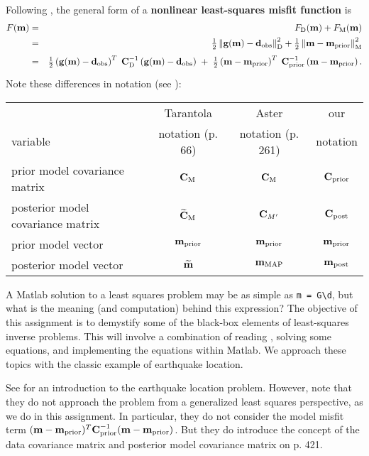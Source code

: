 \documentclass[11pt,titlepage,fleqn]{article}
\begin{document}
Following \citet[][p.~205]{Tarantola2005}, the general form of a {\bf nonlinear least-squares misfit function} is
%
\begin{eqnarray*}
\misfitvar(\bem) &=& \misfitvar_{\rm D}(\bem) + \misfitvar_{\rm M}(\bem) 
\\
&=& \hlf \left\| \bg(\bem) - \bd_{\rm obs} \right\|^2_{\rm D} + \hlf \left\| \bem - \mprior \right\|^2_{\rm M}
\nonumber \\
&=& \hlf \left( \bg(\bem) - \bd_{\rm obs}\right)^T \; \covdi \left( \bg(\bem) - \bd_{\rm obs} \right)
\;+\; \hlf \left( \bem - \mprior \right)^T \; \cpriori \left( \bem - \mprior \right).
\nonumber
\end{eqnarray*}
%
Note these differences in notation (see ):

\vspace{0.2cm}
\begin{tabular}{l|c|c|c}
\hline
                                    & Tarantola         & Aster    & our \\ 
variable                            & notation (p. 66) & notation (p. 261)  & notation \\ \hline
prior model covariance matrix       & $\mbox{${\bf C}$}_{\rm M}$                & $\mbox{${\bf C}$}_{\rm M}$    & $\mbox{${\bf C}$}_{\rm prior}$    \\ \hline
posterior model covariance matrix   & $\widetilde{\mbox{${\bf C}$}}_{\rm M}$    & $\mbox{${\bf C}$}_{M'}$      & $\mbox{${\bf C}$}_{\rm post}$     \\ \hline
prior model vector                  & $\mbox{${\bf m}$}_{\rm prior}$                  & $\mbox{${\bf m}$}_{\rm prior}$      & $\mbox{${\bf m}$}_{\rm prior}$     \\ \hline
posterior model vector              & $\widetilde{\mbox{${\bf m}$}}$         & $\mbox{${\bf m}$}_{\rm MAP}$ & $\mbox{${\bf m}$}_{\rm post}$     \\ \hline
\hline
\end{tabular}
\vspace{0.2cm}

A Matlab solution to a least squares problem may be as simple as \verb+m = G\d+, but what is the meaning (and computation) behind this expression? The objective of this assignment is to demystify some of the black-box elements of least-squares inverse problems. This will involve a combination of reading \citet{Tarantola2005}, solving some equations, and implementing the equations within Matlab. We approach these topics with the classic example of earthquake location.

See \citet[][Chapter 7]{SteinWysession} for an introduction to the earthquake location problem. However, note that they do not approach the problem from a generalized least squares perspective, as we do in this assignment. In particular, they do not consider the model misfit term $(\mbox{${\bf m}$}-\mbox{${\bf m}$}_{\rm prior})^T \mbox{${\bf C}$}_{\rm prior}^{-1} (\mbox{${\bf m}$}-\mbox{${\bf m}$}_{\rm prior})$. But they do introduce the concept of the data covariance matrix and posterior model covariance matrix on p. 421.
\end{document}
